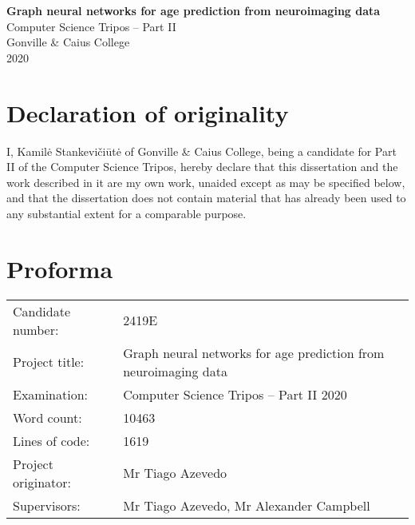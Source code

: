 \pagestyle{empty}
\thispagestyle{empty}


\vspace*{60mm}
\begin{center}
\Large
\textbf{Graph neural networks for age prediction from neuroimaging data} \\[5mm]
\large
Computer Science Tripos -- Part II \\[5mm]
Gonville \& Caius College \\[5mm]
2020
\end{center}


\pagestyle{plain}
\newpage
\chapter*{Declaration of originality}

I, Kamilė Stankevičiūtė of Gonville \& Caius College, being a candidate for Part II of the Computer Science Tripos, hereby declare that this dissertation and the work described in it are my own work, unaided except as may be specified below, and that the dissertation does not contain material that has already been used to any substantial extent for a comparable purpose.

\bigskip
{}

\medskip
{}

\chapter*{Proforma}

\begin{tabular}{ll}
Candidate number:   & 2419E                  \\
Project title:      & Graph neural networks for age prediction from neuroimaging data \\
Examination:        & Computer Science Tripos -- Part II 2020 \\
Word count:         & 10463\footnotemark[1] \\
Lines of code:      & 1619  \\
Project originator: & Mr Tiago Azevedo                        \\
Supervisors:        & Mr Tiago Azevedo, Mr Alexander Campbell \\ 
\end{tabular}

